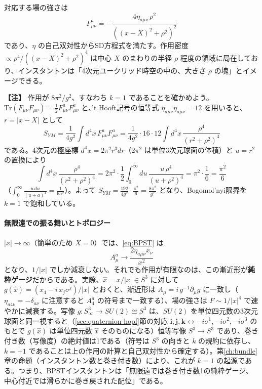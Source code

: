 \documentclass[uplatex, dvipdfmx, book]{jsbook}
\newenvironment{note}{\vspace{1ex}\par\footnotesize\noindent\textbf{【注】}}{\par\vspace{1ex}}
\begin{document}
対応する場の強さは
\begin{equation}
    F^a_{\mu\nu} = -\frac{4 \eta_{a\mu\nu}\, \rho^2}{\left( (x - X)^2 + \rho^2 \right)^2}
\end{equation}
であり、$\eta$ の自己双対性からSD方程式を満たす。作用密度 $\propto \rho^4/((x-X)^2 + \rho^2)^4$ は中心 $X$ のまわりの半径 $\rho$ 程度の領域に局在しており、インスタントンは「4次元ユークリッド時空の中の、大きさ $\rho$ の塊」とイメージできる。

\begin{note}
作用が $8\pi^2/g^2$、すなわち $k = 1$ であることを確かめよう。$\mathrm{Tr}(F_{\mu\nu}F_{\mu\nu}) = \frac{1}{2}F^a_{\mu\nu}F^a_{\mu\nu}$ と、't Hooft記号の恒等式 $\eta_{a\mu\nu}\eta_{a\mu\nu} = 12$ を用いると、$r = |x - X|$ として
\begin{equation*}
    S_{YM} = \frac{1}{4g^2}\int d^4x\, F^a_{\mu\nu}F^a_{\mu\nu} = \frac{1}{4g^2} \cdot 16 \cdot 12 \int d^4x\, \frac{\rho^4}{(r^2 + \rho^2)^4}
\end{equation*}
である。4次元の極座標 $d^4x = 2\pi^2 r^3 dr$（$2\pi^2$ は単位3次元球面の体積）と $u = r^2$ の置換により
\begin{equation*}
    \int d^4x\, \frac{\rho^4}{(r^2 + \rho^2)^4} = 2\pi^2 \cdot \frac{1}{2}\int_0^\infty du\, \frac{u\, \rho^4}{(u + \rho^2)^4} = \pi^2 \cdot \frac{1}{6} = \frac{\pi^2}{6}
\end{equation*}
（$\int_0^\infty \frac{u\, du}{(u + a)^4} = \frac{1}{6a^2}$）。よって $S_{YM} = \frac{192}{4g^2}\cdot\frac{\pi^2}{6} = \frac{8\pi^2}{g^2}$ となり、Bogomol'nyi限界を $k = 1$ で飽和している。
\end{note}

\paragraph{無限遠での振る舞いとトポロジー}
$|x| \to \infty$（簡単のため $X = 0$）では、\eqref{eq:BPST} は
\begin{equation}
    A_\mu^a \to \frac{2\eta_{a\mu\nu}x_\nu}{x^2}
\end{equation}
となり、$1/|x|$ でしか減衰しない。それでも作用が有限なのは、この漸近形が\textbf{純粋ゲージ}だからである。実際、$\hat{x} = x/|x| \in S^3$ に対して $g(\hat{x}) = (x_4 - i\,x_j\sigma^j)/|x|$ とおくと、漸近形は $A_\mu = i\,g^{-1}\partial_\mu g$ に一致し（$\eta_{a4\nu} = -\delta_{a\nu}$ に注意すると $A^a_4$ の符号まで一致する）、場の強さは $F \sim 1/|x|^4$ で速やかに減衰する。写像 $g: S^3_\infty \to SU(2) \cong S^3$ は、$SU(2)$ を単位四元数の3次元球面と同一視すると（\ref{sec:quaternion-hopf}節の対応 $\bm{i}, \bm{j}, \bm{k} \leftrightarrow -i\sigma^1, -i\sigma^2, -i\sigma^3$ のもとで $g(\hat{x})$ は単位四元数 $\hat{x}$ そのものになる）恒等写像 $S^3 \to S^3$ であり、巻き付き数（写像度）の絶対値は1である（符号は $S^3$ の向きと $k$ の規約に依存し、$k = +1$ であることは上の作用の計算と自己双対性から確定する）。第\ref{ch:bundle}章の命題（インスタントン数と巻き付き数）により、これが $k = 1$ の起源である。つまり、BPSTインスタントンは「無限遠では巻き付き数1の純粋ゲージ、中心付近では滑らかに巻き戻された配位」である。
\end{document}
